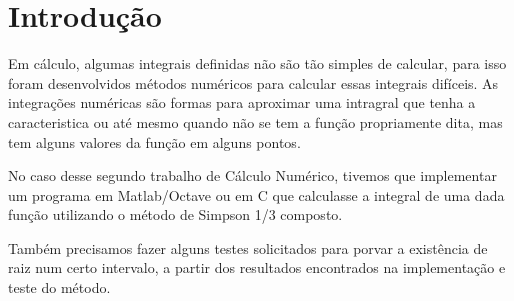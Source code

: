 \chapter*[Introdução]{Introdução}
Em cálculo, algumas integrais definidas não são tão simples de calcular, para
isso foram desenvolvidos métodos numéricos para calcular essas integrais
difíceis. As integrações numéricas são formas para aproximar uma intragral que
tenha a caracteristica ou até mesmo quando não se tem a função propriamente
dita, mas tem alguns valores da função em alguns pontos.

No caso desse segundo trabalho de Cálculo Numérico, tivemos que implementar um
programa em Matlab/Octave ou em C que calculasse a integral de uma dada função
utilizando o método de Simpson 1/3 composto.

Também precisamos fazer alguns testes solicitados para porvar a existência de
raiz num certo intervalo, a partir dos resultados encontrados na implementação e
teste do método.
